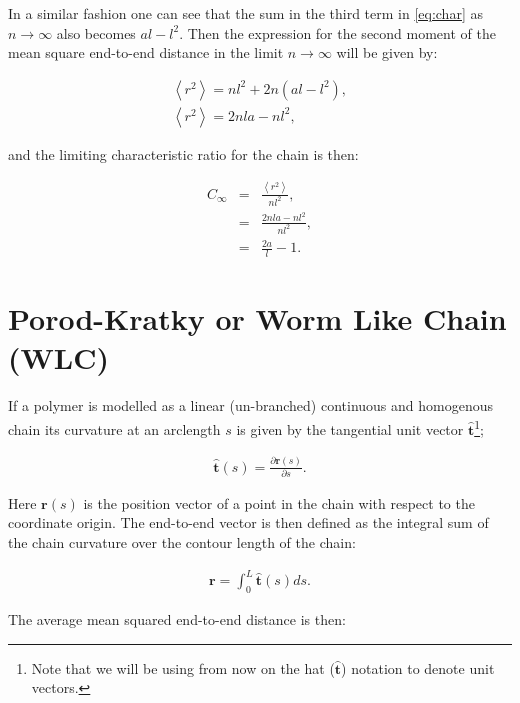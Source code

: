 In a similar fashion one can see that the sum in the third term in
\ref{eq:char} as $n \to \infty$ also becomes $al-l^{2}$.
Then the expression for the second moment of the mean square
end-to-end distance in the limit $n \to \infty$ will be given by:

\begin{gather}
\left<r^{2}\right> = nl^{2} + 2n(al-l^{2}) ,\\
\left<r^{2}\right> = 2nla - nl^{2} ,
\end{gather}  

and the limiting characteristic ratio for the chain is then:

\begin{eqnarray}
C_{\infty} & = & \frac{\left<r^{2}\right>}{ nl^{2}} ,\\
          & = & \frac{2nla - nl^{2}}{nl^{2}} ,\\
          & = & \frac{2a}{l} - 1 .
\end{eqnarray}  

\section{Porod-Kratky or Worm Like Chain (WLC)}
If a polymer is modelled as a linear (un-branched) continuous and
homogenous chain its curvature at an arclength $s$ is given by the
tangential unit vector $\hat{\mathbf{t}}$\footnote{Note that we will
be using from now on the hat ($\hat{\mathbf{t}}$) notation to denote
unit vectors.};

\begin{gather}
\hat{\mathbf{t}}(s)=\frac{\partial{\textbf{r}(s)}}{\partial{s}} .
\end{gather}

Here $\textbf{r}(s)$ is the position vector of a point in the chain
with respect to the coordinate origin.
The end-to-end vector is then defined as the integral sum of the chain
curvature over the contour length of the chain:

\begin{gather}
\textbf{r}=\int_{0}^{L}\hat{\textbf{t}}(s)ds .
\end{gather}

The average mean squared end-to-end distance is then:

